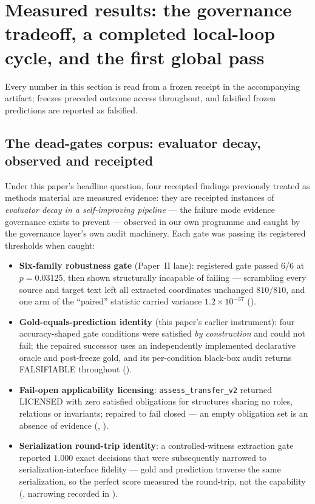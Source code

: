 \section{Measured results: the governance tradeoff, a completed local-loop cycle, and the first global pass}
\label{sec:tradeoff-results}

Every number in this section is read from a frozen receipt in the accompanying
artifact; freezes preceded outcome access throughout, and falsified frozen predictions
are reported as falsified.

\subsection{The dead-gates corpus: evaluator decay, observed and receipted}
\label{sec:dead-gates}

Under this paper's headline question, four receipted findings previously treated as
methods material are measured evidence: they are receipted instances of \emph{evaluator
decay in a self-improving pipeline} --- the failure mode evidence governance exists to
prevent --- observed in our own programme and caught by the governance layer's own
audit machinery. Each gate was passing its registered thresholds when caught:

\begin{itemize}[leftmargin=1.4em,itemsep=2pt]
\item \textbf{Six-family robustness gate} (Paper~II lane): registered gate passed 6/6
at $p=0.03125$, then shown structurally incapable of failing --- scrambling every
source and target text left all extracted coordinates unchanged $810/810$, and one arm
of the ``paired'' statistic carried variance $1.2\times10^{-37}$
().
\item \textbf{Gold-equals-prediction identity} (this paper's earlier instrument): four
accuracy-shaped gate conditions were satisfied \emph{by construction} and could not
fail; the repaired successor uses an independently implemented declarative oracle and
post-freeze gold, and its per-condition black-box audit returns FALSIFIABLE throughout
().
\item \textbf{Fail-open applicability licensing}: \texttt{assess\_transfer\_v2} returned
LICENSED with zero satisfied obligations for structures sharing no roles, relations or
invariants; repaired to fail closed --- an empty obligation set is an absence of
evidence (,
).
\item \textbf{Serialization round-trip identity}: a controlled-witness extraction gate
reported $1.000$ exact decisions that were subsequently narrowed to
serialization-interface fidelity --- gold and prediction traverse the same
serialization, so the perfect score measured the round-trip, not the capability
(,
narrowing recorded in ).
\end{itemize}

